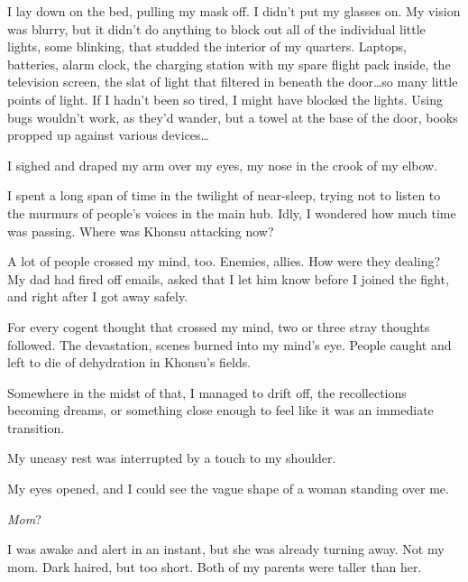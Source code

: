 I lay down on the bed, pulling my mask off.  I didn't put my glasses on.  My vision was blurry, but it didn't do anything to block out all of the individual little lights, some blinking, that studded the interior of my quarters.  Laptops, batteries, alarm clock, the charging station with my spare flight pack inside, the television screen, the slat of light that filtered in beneath the door\ldots so many little points of light.  If I hadn't been so tired, I might have blocked the lights.  Using bugs wouldn't work, as they'd wander, but a towel at the base of the door, books propped up against various devices\ldots



I sighed and draped my arm over my eyes, my nose in the crook of my elbow.



I spent a long span of time in the twilight of near-sleep, trying not to listen to the murmurs of people's voices in the main hub.  Idly, I wondered how much time was passing.  Where was Khonsu attacking now?



A lot of people crossed my mind, too.  Enemies, allies.  How were they dealing?  My dad had fired off emails, asked that I let him know before I joined the fight, and right after I got away safely.



For every cogent thought that crossed my mind, two or three stray thoughts followed.  The devastation, scenes burned into my mind's eye.  People caught and left to die of dehydration in Khonsu's fields.



Somewhere in the midst of that, I managed to drift off, the recollections becoming dreams, or something close enough to feel like it was an immediate transition.



My uneasy rest was interrupted by a touch to my shoulder.



My eyes opened, and I could see the vague shape of a woman standing over me.



\emph{Mom}?



I was awake and alert in an instant, but she was already turning away.  Not my mom.  Dark haired, but too short.  Both of my parents were taller than her.



